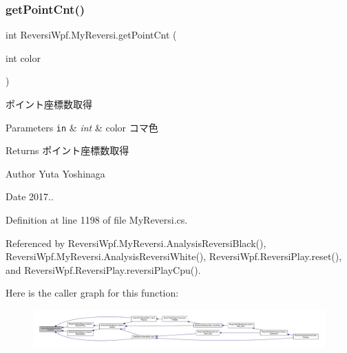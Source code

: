 \subsubsection{\texorpdfstring{get\+Point\+Cnt()}{getPointCnt()}}
{\footnotesize\ttfamily int Reversi\+Wpf.\+My\+Reversi.\+get\+Point\+Cnt (\begin{DoxyParamCaption}\item[{int}]{color }\end{DoxyParamCaption})}



ポイント座標数取得 


\begin{DoxyParams}[1]{Parameters}
\mbox{\tt in}  & {\em int} & color コマ色 \\
\hline
\end{DoxyParams}
\begin{DoxyReturn}{Returns}
ポイント座標数取得 
\end{DoxyReturn}
\begin{DoxyAuthor}{Author}
Yuta Yoshinaga 
\end{DoxyAuthor}
\begin{DoxyDate}{Date}
2017.. 
\end{DoxyDate}


Definition at line 1198 of file My\+Reversi.\+cs.



Referenced by Reversi\+Wpf.\+My\+Reversi.\+Analysis\+Reversi\+Black(), Reversi\+Wpf.\+My\+Reversi.\+Analysis\+Reversi\+White(), Reversi\+Wpf.\+Reversi\+Play.\+reset(), and Reversi\+Wpf.\+Reversi\+Play.\+reversi\+Play\+Cpu().

Here is the caller graph for this function\+:\nopagebreak
\begin{figure}[H]
\begin{center}
\leavevmode
\includegraphics[width=350pt]{class_reversi_wpf_1_1_my_reversi_a86f08f7b19fe00b88ef7236bd784a451_icgraph}
\end{center}
\end{figure}
\mbox{\label{class_reversi_wpf_1_1_my_reversi_a7e4d94600afb1b9d512341b1692769e7}} 

